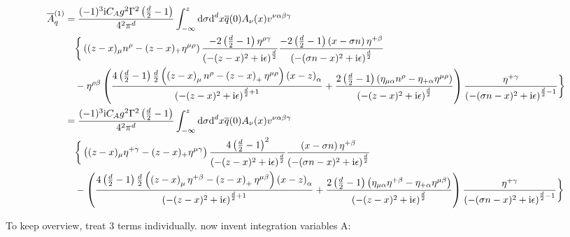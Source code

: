 \begin{align}
	\overline A_q^{(1)}
	&=
	\frac{(-1)^3 \text{i} C_A g^2 \Gamma^2\left( \frac{d}{2} -1\right)}{4^2\pi^{d}} \int_{-\infty}^z \text{d} \sigma \text{d} ^d x  \overline q(0) A_\nu (x) v^{\nu\alpha\beta\gamma}
	\\&~~~
	\bigg\{ \left( (z-x)_\mu n^\rho - (z-x)_+ \eta^{\mu \rho} \right) \frac{-2\left(\frac{d}{2}-1\right)\eta^{\rho \gamma}}{ \left(-(z-x)^2+\text{i}\epsilon\right)^{\frac{d}{2}}} \frac{-2\left(\frac{d}{2}-1\right)\left( x- \sigma n \right)\eta^{+\beta}}{ \left(-(\sigma n -x)^2+\text{i}\epsilon\right)^{\frac{d}{2}}} 
	\\&~~~
	- \eta^{\rho \beta} \left(\frac{4 \left(\frac{d}{2}-1\right)\frac{d}{2}\left(\left(z-x\right)_\mu n^\rho -\left(z-x\right)_+ \eta^{\mu \rho}  \right)\left(x-z\right)_\alpha}{ \left(-(z-x)^2+\text{i}\epsilon\right)^{\frac{d}{2}+1}} + \frac{2\left(\frac{d}{2}-1\right)\left(\eta_{\mu\alpha}n^\rho-\eta_{+\alpha}\eta^{\mu \rho}\right)}{\left(-(z -x)^2+\text{i}\epsilon\right)^{\frac{d}{2}}} \right)\frac{\eta^{+ \gamma}}{ \left(-(\sigma n -x)^2+\text{i}\epsilon\right)^{\frac{d}{2}-1}} \bigg\}
	\\
	&=
	\frac{(-1)^3 \text{i} C_A g^2 \Gamma^2\left( \frac{d}{2} -1\right)}{4^2\pi^{d}} \int_{-\infty}^z \text{d} \sigma \text{d} ^d x  \overline q(0) A_\nu (x) v^{\nu\alpha\beta\gamma}
	\\&~~~
	\bigg\{ \left( (z-x)_\mu \eta^{+ \gamma} - (z-x)_+ \eta^{\mu \gamma} \right) \frac{4\left(\frac{d}{2}-1\right)^2}{ \left(-(z-x)^2+\text{i}\epsilon\right)^{\frac{d}{2}}} \frac{\left( x- \sigma n \right)\eta^{+\beta}}{ \left(-(\sigma n -x)^2+\text{i}\epsilon\right)^{\frac{d}{2}}} 
	\\&~~~
	-  \left(\frac{4 \left(\frac{d}{2}-1\right)\frac{d}{2}\left(\left(z-x\right)_\mu \eta^{+ \beta} -\left(z-x\right)_+ \eta^{\mu \beta}  \right)\left(x-z\right)_\alpha}{ \left(-(z-x)^2+\text{i}\epsilon\right)^{\frac{d}{2}+1}} + \frac{2\left(\frac{d}{2}-1\right)\left(\eta_{\mu\alpha}\eta^{+ \beta}-\eta_{+\alpha}\eta^{\mu \beta}\right)}{\left(-(z -x)^2+\text{i}\epsilon\right)^{\frac{d}{2}}} \right)\frac{\eta^{+ \gamma}}{ \left(-(\sigma n -x)^2+\text{i}\epsilon\right)^{\frac{d}{2}-1}} \bigg\}
\end{align}

To keep overview, treat 3 terms individually.
now invent integration variables
A:

